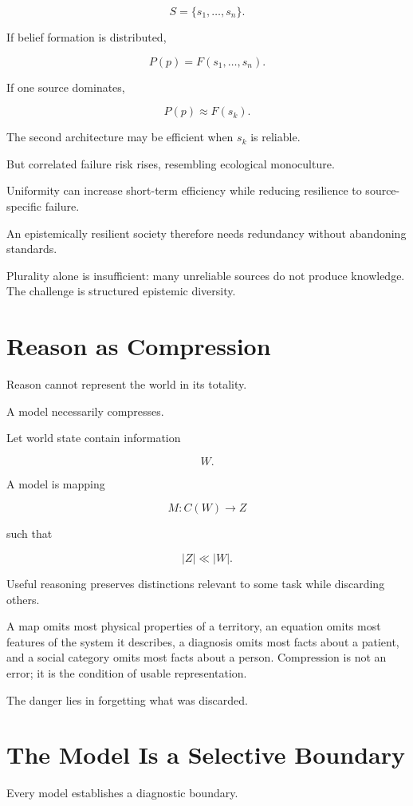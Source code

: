 \documentclass[11pt,oneside]{book}
\theoremstyle{definition}
\theoremstyle{remark}
\begin{document}
\[
S=\{s_1,\ldots,s_n\}.
\]

If belief formation is distributed,

\[
P(p)
=
F(s_1,\ldots,s_n).
\]

If one source dominates,

\[
P(p)
\approx
F(s_k).
\]

The second architecture may be efficient when \(s_k\) is reliable.

But correlated failure risk rises, resembling ecological monoculture.

Uniformity can increase short-term efficiency while reducing resilience to source-specific failure.

An epistemically resilient society therefore needs redundancy without abandoning standards.

Plurality alone is insufficient: many unreliable sources do not produce knowledge. The challenge is structured epistemic diversity.

\section{Reason as Compression}

Reason cannot represent the world in its totality.

A model necessarily compresses.

Let world state contain information

\[
W.
\]

A model is mapping

\[
M:C(W)\rightarrow Z
\]

such that

\[
|Z|\ll|W|.
\]

Useful reasoning preserves distinctions relevant to some task while discarding others.

A map omits most physical properties of a territory, an equation omits most features of the system it describes, a diagnosis omits most facts about a patient, and a social category omits most facts about a person. Compression is not an error; it is the condition of usable representation.

The danger lies in forgetting what was discarded.

\section{The Model Is a Selective Boundary}

Every model establishes a diagnostic boundary.
\end{document}
